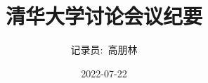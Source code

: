 

\thispagestyle{fancy}   %
\title{\hei 清华大学讨论会议纪要}
\author[ ]{记录员:~高朋林}   %
\renewcommand*{\Authfont}{\small\rm} %
\renewcommand*{\Affilfont}{\small\it} %
\renewcommand\Authands{ and } %
\renewcommand\Authands{ , } %
\date{\footnotesize\rm 2022-07-22}							     %


\maketitle

